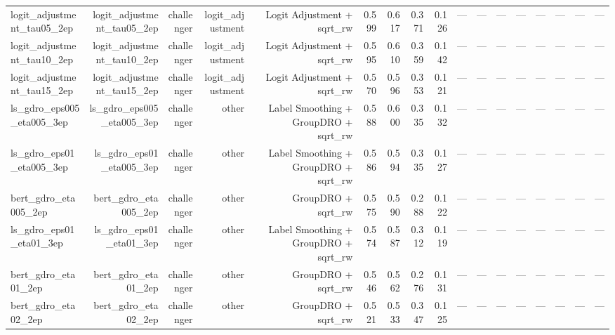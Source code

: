 \begin{tabular}{lrrrrrrrrrrrrrrrr}
logit\_adjustment\_tau05\_2ep & logit\_adjustment\_tau05\_2ep & challenger & logit\_adjustment & Logit Adjustment + sqrt\_rw & 0.599 & 0.617 & 0.371 & 0.126 & --- & --- & --- & --- & --- & --- & --- & --- \\
logit\_adjustment\_tau10\_2ep & logit\_adjustment\_tau10\_2ep & challenger & logit\_adjustment & Logit Adjustment + sqrt\_rw & 0.595 & 0.610 & 0.359 & 0.142 & --- & --- & --- & --- & --- & --- & --- & --- \\
logit\_adjustment\_tau15\_2ep & logit\_adjustment\_tau15\_2ep & challenger & logit\_adjustment & Logit Adjustment + sqrt\_rw & 0.570 & 0.596 & 0.353 & 0.121 & --- & --- & --- & --- & --- & --- & --- & --- \\
ls\_gdro\_eps005\_eta005\_3ep & ls\_gdro\_eps005\_eta005\_3ep & challenger & other & Label Smoothing + GroupDRO + sqrt\_rw & 0.588 & 0.600 & 0.335 & 0.132 & --- & --- & --- & --- & --- & --- & --- & --- \\
ls\_gdro\_eps01\_eta005\_3ep & ls\_gdro\_eps01\_eta005\_3ep & challenger & other & Label Smoothing + GroupDRO + sqrt\_rw & 0.586 & 0.594 & 0.335 & 0.127 & --- & --- & --- & --- & --- & --- & --- & --- \\
bert\_gdro\_eta005\_2ep & bert\_gdro\_eta005\_2ep & challenger & other & GroupDRO + sqrt\_rw & 0.575 & 0.590 & 0.288 & 0.122 & --- & --- & --- & --- & --- & --- & --- & --- \\
ls\_gdro\_eps01\_eta01\_3ep & ls\_gdro\_eps01\_eta01\_3ep & challenger & other & Label Smoothing + GroupDRO + sqrt\_rw & 0.574 & 0.587 & 0.312 & 0.119 & --- & --- & --- & --- & --- & --- & --- & --- \\
bert\_gdro\_eta01\_2ep & bert\_gdro\_eta01\_2ep & challenger & other & GroupDRO + sqrt\_rw & 0.546 & 0.562 & 0.276 & 0.131 & --- & --- & --- & --- & --- & --- & --- & --- \\
bert\_gdro\_eta02\_2ep & bert\_gdro\_eta02\_2ep & challenger & other & GroupDRO + sqrt\_rw & 0.521 & 0.533 & 0.347 & 0.125 & --- & --- & --- & --- & --- & --- & --- & --- \\
\bottomrule
\end{tabular}
